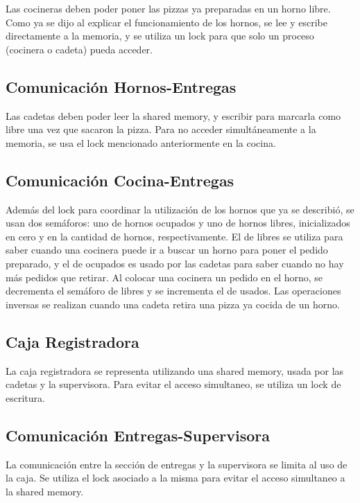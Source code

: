 \documentclass[11pt,spanish,a4paper,openany,notitlepage]{article}
\begin{document}
Las cocineras deben poder poner las pizzas ya preparadas en un horno libre. Como ya se dijo al 
explicar el funcionamiento de los hornos, se lee y escribe directamente a la memoria, y se utiliza 
un lock para que solo un proceso (cocinera o cadeta) pueda acceder.

\subsection{Comunicación Hornos-Entregas}

Las cadetas deben poder leer la shared memory, y escribir para marcarla como libre una vez que 
sacaron la pizza. Para no acceder simultáneamente a la memoria, se usa el lock mencionado 
anteriormente en la cocina.

\subsection{Comunicación Cocina-Entregas}

Además del lock para coordinar la utilización de los hornos que ya se describió, se usan dos 
semáforos: uno de hornos ocupados y uno de hornos libres, inicializados en cero y en la cantidad de 
hornos, respectivamente. El de libres se utiliza para saber cuando una cocinera puede ir a buscar 
un horno para poner el pedido preparado, y el de ocupados es usado por las cadetas para saber 
cuando no hay más pedidos que retirar. Al colocar una cocinera un pedido en el horno, se decrementa 
el semáforo de libres y se incrementa el de usados. Las operaciones inversas se realizan cuando una 
cadeta retira una pizza ya cocida de un horno.\\

\subsection{Caja Registradora}

La caja registradora se representa utilizando una shared memory, usada por las cadetas y la 
supervisora. Para evitar el acceso simultaneo, se utiliza un lock de escritura.

\subsection{Comunicación Entregas-Supervisora}

La comunicación entre la sección de entregas y la supervisora se limita al uso de la caja. Se 
utiliza el lock asociado a la misma para evitar el acceso simultaneo a la shared memory.
\end{document}
